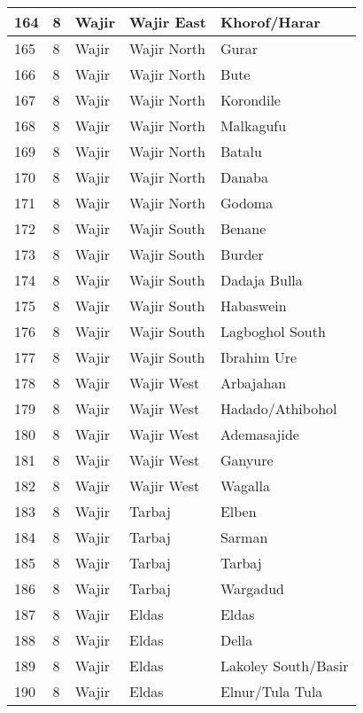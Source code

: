 \begin{table}[!ht]
\begin{tabular}{|l|l|l|l|l|}
        164 & 8 & Wajir & Wajir East & Khorof/Harar \\ \hline
        165 & 8 & Wajir & Wajir North & Gurar \\ \hline
        166 & 8 & Wajir & Wajir North & Bute \\ \hline
        167 & 8 & Wajir & Wajir North & Korondile \\ \hline
        168 & 8 & Wajir & Wajir North & Malkagufu \\ \hline
        169 & 8 & Wajir & Wajir North & Batalu \\ \hline
        170 & 8 & Wajir & Wajir North & Danaba \\ \hline
        171 & 8 & Wajir & Wajir North & Godoma \\ \hline
        172 & 8 & Wajir & Wajir South & Benane \\ \hline
        173 & 8 & Wajir & Wajir South & Burder \\ \hline
        174 & 8 & Wajir & Wajir South & Dadaja Bulla \\ \hline
        175 & 8 & Wajir & Wajir South & Habaswein \\ \hline
        176 & 8 & Wajir & Wajir South & Lagboghol South \\ \hline
        177 & 8 & Wajir & Wajir South & Ibrahim Ure \\ \hline
        178 & 8 & Wajir & Wajir West & Arbajahan \\ \hline
        179 & 8 & Wajir & Wajir West & Hadado/Athibohol \\ \hline
        180 & 8 & Wajir & Wajir West & Ademasajide \\ \hline
        181 & 8 & Wajir & Wajir West & Ganyure \\ \hline
        182 & 8 & Wajir & Wajir West & Wagalla \\ \hline
        183 & 8 & Wajir & Tarbaj & Elben \\ \hline
        184 & 8 & Wajir & Tarbaj & Sarman \\ \hline
        185 & 8 & Wajir & Tarbaj & Tarbaj \\ \hline
        186 & 8 & Wajir & Tarbaj & Wargadud \\ \hline
        187 & 8 & Wajir & Eldas & Eldas \\ \hline
        188 & 8 & Wajir & Eldas & Della \\ \hline
        189 & 8 & Wajir & Eldas & Lakoley South/Basir \\ \hline
        190 & 8 & Wajir & Eldas & Elnur/Tula Tula \\ \hline

\end{tabular}
\end{table}
